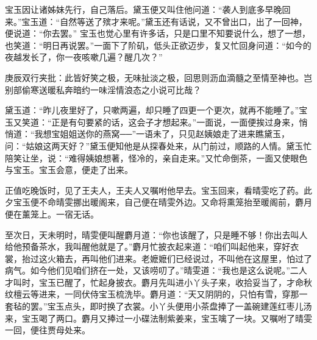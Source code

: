 \begin{parag}
    宝玉因让诸姊妹先行，自己落后。黛玉便又叫住他问道：“袭人到底多早晚回来。”宝玉道：“自然等送了殡才来呢。”黛玉还有话说，又不曾出口，出了一回神，便说道：“你去罢。” 宝玉也觉心里有许多话，只是口里不知要说什么，想了一想，也笑道：“明日再说罢。”一面下了阶矶，低头正欲迈步，复又忙回身问道：“如今的夜越发长了，你一夜咳嗽几遍？醒几次？”\begin{note}庚辰双行夹批：此皆好笑之极，无味扯淡之极，回思则沥血滴髓之至情至神也。岂别部偷寒送暖私奔暗约一味淫情浪态之小说可比哉？\end{note}黛玉道：“昨儿夜里好了，只嗽两遍，却只睡了四更一个更次，就再不能睡了。”宝玉又笑道：“正是有句要紧的话，这会子才想起来。”一面说，一面便挨过身来，悄悄道：“我想宝姐姐送你的燕窝──”一语未了，只见赵姨娘走了进来瞧黛玉，问：“姑娘这两天好？”黛玉便知他是从探春处来，从门前过，顺路的人情。黛玉忙陪笑让坐，说：“难得姨娘想著，怪冷的，亲自走来。”又忙命倒茶，一面又使眼色与宝玉。宝玉会意，便走了出来。
\end{parag}


\begin{parag}
    正值吃晚饭时，见了王夫人，王夫人又嘱咐他早去。宝玉回来，看晴雯吃了药。此夕宝玉便不命晴雯挪出暖阁来，自己便在晴雯外边。又命将熏笼抬至暖阁前，麝月便在薰笼上。一宿无话。
\end{parag}


\begin{parag}
    至次日，天未明时，晴雯便叫醒麝月道：“你也该醒了，只是睡不够！你出去叫人给他预备茶水，我叫醒他就是了。”麝月忙披衣起来道：“咱们叫起他来，穿好衣裳，抬过这火箱去，再叫他们进来。老嬷嬷们已经说过，不叫他在这屋里，怕过了病气。如今他们见咱们挤在一处，又该唠叨了。”晴雯道：“我也是这么说呢。”二人才叫时，宝玉已醒了，忙起身披衣。麝月先叫进小丫头子来，收拾妥当了，才命秋纹檀云等进来，一同伏侍宝玉梳洗毕。麝月道：“天又阴阴的，只怕有雪，穿那一套毡的罢。”宝玉点头，即时换了衣裳。小丫头便用小茶盘捧了一盖碗建莲红枣儿汤来，宝玉喝了两口。麝月又捧过一小碟法制紫姜来，宝玉噙了一块。又嘱咐了晴雯一回，便往贾母处来。
\end{parag}


